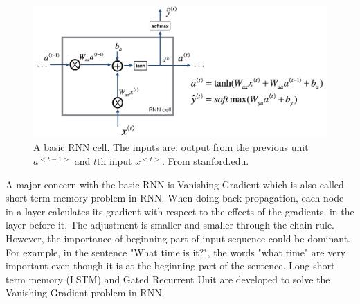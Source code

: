 \begin{figure}[h!]
\begin{center}
\includegraphics[width = 13cm]{img/basic_rnn.png}
\caption[A basic RNN cell]{A basic RNN cell. The inputs are: output from the previous unit $a^{<t-1>}$ and $t$th input $x^{<t>}$. From stanford.edu. \label{fig_RNN}}
\end{center}
\end{figure}

A major concern with the basic RNN is Vanishing Gradient \cite{pascanu2013difficulty} which is also called short term memory problem in RNN. When doing back propagation, each node in a layer calculates its gradient with respect to the effects of the gradients, in the layer before it. The adjustment is smaller and smaller through the chain rule. However, the importance of beginning part of input sequence could be dominant. For example, in the sentence "What time is it?", the words "what time" are very important even though it is at the beginning part of the sentence. Long short-term memory (LSTM) \cite{hochreiter1997long} and Gated Recurrent Unit \cite{cho2014learning} are developed to solve the Vanishing Gradient problem in RNN.

